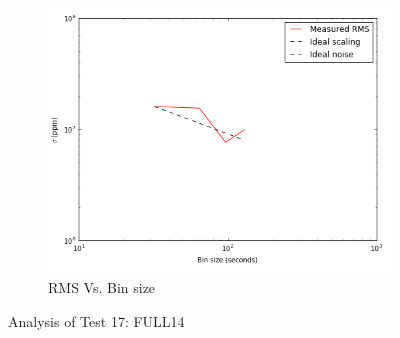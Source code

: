 \documentclass[conference]{IEEEtran}
\begin{document}
\begin{figure}[H]
    \begin{subfigure}{3}
        \includegraphics[scale=0.6]{rms_test17}
        \caption{RMS Vs. Bin size}
    \end{subfigure}
    \caption{Analysis of Test 17: FULL14}
\end{figure}
\end{document}
